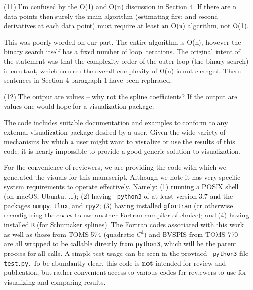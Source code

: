 \goodbreak
{\parindent=20pt \it
  
\item{(11)} I'm confused by the O(1) and O(n) discussion in Section 4.
  If there are n data points then surely the main algorithm
  (estimating first and second derivatives at each data point) must
  require at least an O(n) algorithm, not O(1).

}

This was poorly worded on our part. The entire algorithm is O(n),
however the binary search itself has a fixed number of loop
iterations. The original intent of the statement was that the
complexity order of the outer loop (the binary search) is constant,
which ensures the overall complexity of O(n) is not changed. These
sentences in Section 4 paragraph 1 have been rephrased.


\goodbreak
{\parindent=20pt \it
  
\item{(12)} The output are values -- why not the spline coefficients? If
  the output are values one would hope for a visualization package.

}

The code includes suitable documentation and examples to conform to
any external visualization package desired by a user. Given the wide
variety of mechanisms by which a user might want to visualize or use
the results of this code, it is nearly impossible to provide a good
generic solution to visualization.

For the convenience of reviewers, we are providing the code with which
we generated the visuals for this manuscript. Although we note it has
very specific system requirements to operate effectively. Namely: (1)
running a POSIX shell (on macOS, Ubuntu, $\ldots$); (2) having {\tt
  python3} of at least version $3.7$ and the packages {\tt numpy},
{\tt tlux}, and {\tt rpy2}; (3) having installed {\tt gfortran} (or
otherwise reconfiguring the codes to use another Fortran compiler of
choice); and (4) having installed {\tt R} (for Schumaker splines). The
Fortran codes associated with this work as well as those from TOMS 574
(quadratic $C^1$) and BVSPIS from TOMS 770 are all wrapped to be
callable directly from {\tt python3}, which will be the parent process
for all calls. A simple test usage can be seen in the provided {\tt
  python3} file {\tt test.py}. To be abundantly clear, this code is
{\bf not} intended for review and publication, but rather convenient
access to various codes for reviewers to use for visualizing and
comparing results.


